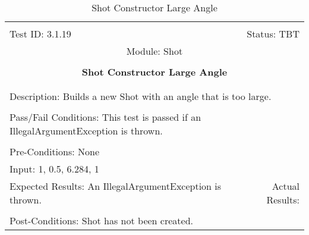 \documentclass[titlepage]{article}
\begin{document}
\begin{center}%
\begin{table}
\begin{tabular}{|l r|}\hline&\\[-2mm]
	Test ID: 3.1.19	&Status: TBT\\[-3mm]
	\multicolumn{2}{|c|}{Module: Shot}\\&\\
	\multicolumn{2}{|c|}{\textbf{\large{Shot Constructor Large Angle}}}\\&\\\hline&\\[-3mm]
	\multicolumn{2}{|p{\textwidth}|}{Description: Builds a new Shot with an angle that is too large.}\\[1mm]\hline&\\[-3mm]
	\multicolumn{2}{|p{\textwidth}|}{Pass/Fail Conditions: This test is passed if an IllegalArgumentException is thrown.}\\[1mm]\hline&\\[-3mm]
	\multicolumn{2}{|p{\textwidth}|}{Pre-Conditions: None}\\[4mm]
	\multicolumn{2}{|p{\textwidth}|}{Input: 1, 0.5, 6.284, 1}\\[2mm]\hline
	\multicolumn{1}{|p{0.49\textwidth}}{Expected Results: An IllegalArgumentException is thrown.}	&\multicolumn{1}{|p{0.45\textwidth}|}{Actual Results: }\\\hline&\\[-3mm]
	\multicolumn{2}{|p{\textwidth}|}{Post-Conditions: Shot has not been created.}\\\hline
\end{tabular}
\caption{Shot Constructor Large Angle}
\end{table}
\end{center}
\end{document}
